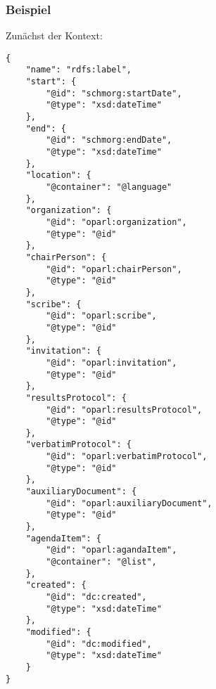 \documentclass[,a4paper]{article}
\begin{document}
\subsubsection{Beispiel}\label{beispiel-4}

Zunächst der Kontext:

\begin{verbatim}
{
    "name": "rdfs:label",
    "start": {
        "@id": "schmorg:startDate",
        "@type": "xsd:dateTime"
    },
    "end": {
        "@id": "schmorg:endDate",
        "@type": "xsd:dateTime"
    },
    "location": {
        "@container": "@language"
    },
    "organization": {
        "@id": "oparl:organization",
        "@type": "@id"
    },
    "chairPerson": {
        "@id": "oparl:chairPerson",
        "@type": "@id"
    },
    "scribe": {
        "@id": "oparl:scribe",
        "@type": "@id"
    },
    "invitation": {
        "@id": "oparl:invitation",
        "@type": "@id"
    },
    "resultsProtocol": {
        "@id": "oparl:resultsProtocol",
        "@type": "@id"
    },
    "verbatimProtocol": {
        "@id": "oparl:verbatimProtocol",
        "@type": "@id"
    },
    "auxiliaryDocument": {
        "@id": "oparl:auxiliaryDocument",
        "@type": "@id"
    },
    "agendaItem": {
        "@id": "oparl:agandaItem",
        "@container": "@list",
    },
    "created": {
        "@id": "dc:created",
        "@type": "xsd:dateTime"
    },  
    "modified": {
        "@id": "dc:modified",
        "@type": "xsd:dateTime"
    }
}
\end{verbatim}
\end{document}
